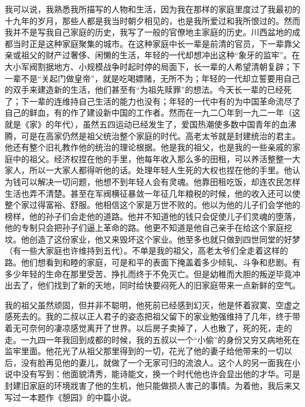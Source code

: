 \par 我可以说，我熟悉我所描写的人物和生活，因为我在那样的家庭里度过了我最初的十九年的岁月，那些人都是我当时朝夕相见的，也是我所爱过和我所恨过的。然而我并不是写我自己家庭的历史，我写了一般的官僚地主家庭的历史。川西盆地的成都当时正是这种家庭聚集的城市。在这种家庭中长一辈是前清的官员，下一辈靠父亲或祖父的财产过奢侈、闲懒的生活，年轻的一代却想冲出这种“象牙的监牢”。在大小军阀割据地方、小规模战争时起时停的局面下，长一辈的人希望清朝复辟；下一辈不是“关起门做皇帝”，就是吃喝嫖赌，无所不为；年轻的一代却立誓要用自己的双手来建造新的生活，他们甚至有“为祖先赎罪”的想法。今天长一辈的已经死了；下一辈的连维持自己生活的能力也没有；年轻的一代中有的为中国革命流尽了自己的鲜血，有的作了建设新中国的工作者。然而在一九二〇年到一九二一年（这就是《家》的年代），虽然五四运动已经发生了，爱国热潮使多数中国青年的血沸腾，可是在高家仍然是祖父统治整个家庭的时代。高老太爷就是封建统治的君主。他还有整个旧礼教作他的统治的理论根据。他是我的祖父，也是我的一些亲戚的家庭中的祖父。经济权捏在他的手里，他每年收入那么多的田租，可以养活整整一大家人，所以一大家人都得听他的话。处理年轻人生死的大权也捏在他的手里。他认为钱可以解决一切问题，他想不到年轻人会有灵魂。他靠田租吃饭，却连农民怎样生活也弄不清楚。甚至在军阀横征暴敛一年征几年粮税的时候，他的收入还可以使整个家过得富裕、舒服。他相信这个家是万世不败的。他以为他的儿子们会学他的榜样，他的孙子们会走他的道路。他并不知道他的钱只会促使儿子们灵魂的堕落，他的专制只会把孙子们逼上革命的路。他更不知道是他自己亲手在给这个家庭挖坟。他创造了这份家业，他又来毁坏这个家业。他至多也就只做到四世同堂的好梦（有一些大家庭也许维持到五代）。不单是我的祖父，高老太爷们全走着这样的路。他们想看到和睦的家庭，可是和平的表面下掩盖着多少倾轧、斗争和悲剧。有多少年轻的生命在那里受苦、挣扎而终于不免灭亡。但是幼稚而大胆的叛逆毕竟冲出去了，他们找到了新的天地，同时给快要闷死人的旧家庭带来一点新鲜的空气。
\par 我的祖父虽然顽固，但并非不聪明，他死前已经感到幻灭，他是怀着寂寞、空虚之感死去的。我的二叔以正人君子的姿态把祖父留下的家业勉强维持了几年，终于带着无可奈何的凄凉感觉离开了世界。以后房子卖掉了，人也散了，死的死，走的走。一九四一年我回到成都的时候，我的五叔以一个“小偷”的身份又穷又病地死在监牢里面。他花光了从祖父那里得到的一切，花光了他的妻子给他带来的一切以后，没有脸再见他的妻儿，就做了一个无家可归的流浪人。这个人的另一面我在小说中没有写到：他面貌清秀，能诗能文，换一个时代他也许会显出他的才华。可是封建旧家庭的环境戕害了他的生机，他只能做损人害己的事情。为着他，我后来又写过一本题作《憩园》的中篇小说。

